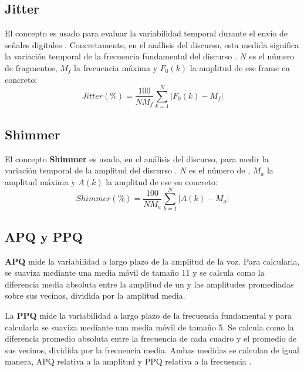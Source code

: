 \subsection{Jitter}
El concepto  es usado para evaluar la variabilidad temporal durante el envío de señales digitales \cite{wiki:jitter}. Concretamente, en el análisis del discurso, esta medida significa la variación temporal de la frecuencia fundamental del discurso \cite{neurospeech}. $N$ es el número de fragmentos, $M_{f}$ la frecuencia máxima y $F_{0}(k)$ la amplitud de ese frame en concreto:
\begin{equation}
\mathit{Jitter}(\%) = \frac{100}{N M_{f}} \sum_{k=1}^{N}|F_{0}(k)-M_{f}|
\end{equation}

\subsection{Shimmer}
El concepto \textbf{Shimmer} es usado, en el análisis del discurso, para medir la variación temporal de la amplitud del discurso \cite{neurospeech}. $N$ es el número de , $M_{a}$ la amplitud máxima y $A(k)$ la amplitud de ese  en concreto:
\begin{equation}
\mathit{Shimmer}(\%) = \frac{100}{N M_{a}} \sum_{k=1}^{N}|A(k)-M_{a}|
\end{equation}

\subsection{APQ y PPQ}
\textbf{APQ} mide la variabilidad a largo plazo de la amplitud de la voz. Para calcularla, se suaviza mediante una media móvil de tamaño 11 y se calcula como la diferencia media absoluta entre la amplitud de un  y las amplitudes promediadas sobre sus vecinos, dividida por la amplitud media.

La \textbf{PPQ} mide la variabilidad a largo plazo de la frecuencia fundamental y para calcularla se suaviza mediante una media móvil de tamaño 5. Se calcula como la diferencia promedio absoluta entre la frecuencia de cada cuadro y el promedio de sus vecinos, dividida por la frecuencia media. Ambas medidas se calculan de igual manera, APQ relativa a la amplitud y PPQ relativa a la frecuencia \cite{neurospeech}.

